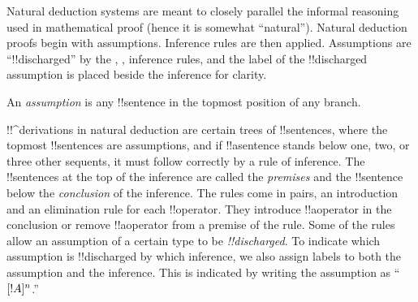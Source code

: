 \documentclass[../../../include/open-logic-section]{subfiles}
\begin{document}
      {}
      {}


\begin{explain}
Natural deduction systems are meant to closely parallel the informal
reasoning used in mathematical proof (hence it is somewhat
``natural''). Natural deduction proofs begin with assumptions.
Inference rules are then applied. Assumptions are ``!!{discharged}''
by the \Intro{\lnot}, \Intro{\lif},  inference rules, and the label of
the !!{discharged} assumption is placed beside the inference for
clarity.
\end{explain}

\begin{defn}[Assumption]
An \emph{assumption} is any !!{sentence}
in the topmost position of any branch.
\end{defn}

!!^{derivation}s in natural deduction are certain trees of
!!{sentence}s, where the topmost !!{sentence}s are assumptions, and if
!!a{sentence} stands below one, two, or three other sequents, it must
follow correctly by a rule of inference. The !!{sentence}s at the top
of the inference are called the \emph{premises} and the !!{sentence}
below the \emph{conclusion} of the inference.  The rules come in
pairs, an introduction and an elimination rule for each
!!{operator}. They introduce !!a{operator} in the conclusion or
remove !!a{operator} from a premise of the rule.  Some of the rules
allow an assumption of a certain type to be \emph{!!{discharged}}. To
indicate which assumption is !!{discharged} by which inference, we
also assign labels to both the assumption and the inference.  This is
indicated by writing the assumption as ``$[!A]^{n}$.''


\end{document}
